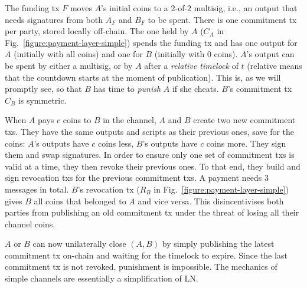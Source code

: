   The funding tx $F$ moves $A$'s initial coins to a $2$-of-$2$ multisig, i.e., an
  output that needs signatures from both $A_F$ and $B_F$ to be spent. There is one
  commitment tx per party, stored locally off-chain. The one held by $A$
  ($C_A$ in Fig.~\ref{figure:payment-layer-simple}) spends the funding tx
  and has one output for $A$ (initially with all coins) and one for $B$
  (initially with $0$ coins). $A$'s output can be spent by either a multisig, or
  by $A$ after a \emph{relative timelock} of $t$ (relative means that the countdown starts at the moment of
  publication). This is, as we will promptly see, so
  that $B$ has time to \emph{punish} $A$ if she cheats. $B$'s commitment tx
  $C_B$ is symmetric.

  When $A$ pays $c$ coins to $B$ in the channel, $A$ and $B$ create two new
  commitment txs.
  They have the same outputs and scripts as their previous ones, save for the
  coins: $A$'s outputs have $c$ coins less, $B$'s outputs have $c$ coins more.
  They sign them and swap signatures. In order to ensure only one set of
  commitment txs is valid at a time, they then revoke their previous ones. To
  that end, they build and sign revocation txs for the previous
  commitment txs. A payment needs $3$ messages in total. $B$'s revocation tx ($R_B$ in
  Fig.~\ref{figure:payment-layer-simple}) gives $B$ all coins that belonged
  to $A$ and vice versa. This disincentivises both parties
  from publishing an old commitment tx under the threat of
  losing all their channel coins.

  $A$ or $B$ can now unilaterally close $(A, B)$ by simply publishing the latest
  commitment tx on-chain and waiting for the timelock to expire. Since the last
  commitment tx is not revoked, punishment is impossible. The
  mechanics of simple channels are essentially a simplification of LN.

